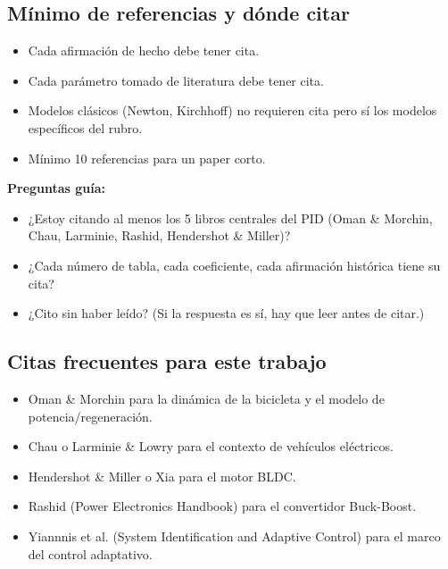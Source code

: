 \documentclass[11pt,a4paper]{article}
\begin{document}
\subsection{Mínimo de referencias y dónde citar}

\begin{itemize}
    \item Cada afirmación de hecho debe tener cita.
    \item Cada parámetro tomado de literatura debe tener cita.
    \item Modelos clásicos (Newton, Kirchhoff) no requieren cita pero sí los modelos específicos del rubro.
    \item Mínimo 10 referencias para un paper corto.
\end{itemize}

\begin{guia}
\textbf{Preguntas guía:}
\begin{itemize}
    \item ¿Estoy citando al menos los 5 libros centrales del PID (Oman \& Morchin, Chau, Larminie, Rashid, Hendershot \& Miller)?
    \item ¿Cada número de tabla, cada coeficiente, cada afirmación histórica tiene su cita?
    \item ¿Cito sin haber leído? (Si la respuesta es sí, hay que leer antes de citar.)
\end{itemize}
\end{guia}

\subsection{Citas frecuentes para este trabajo}

\begin{itemize}
    \item Oman \& Morchin para la dinámica de la bicicleta y el modelo de potencia/regeneración.
    \item Chau o Larminie \& Lowry para el contexto de vehículos eléctricos.
    \item Hendershot \& Miller o Xia para el motor BLDC.
    \item Rashid (Power Electronics Handbook) para el convertidor Buck-Boost.
    \item Yiannnis et al. (System Identification and Adaptive Control) para el marco del control adaptativo.
\end{itemize}

\hrulefill
\end{document}
